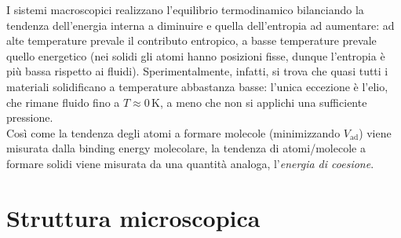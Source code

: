 
I sistemi macroscopici realizzano l'equilibrio termodinamico bilanciando la tendenza dell'energia interna a diminuire e quella dell'entropia ad aumentare: ad alte temperature prevale il contributo entropico, a basse temperature prevale quello energetico (nei solidi gli atomi hanno posizioni fisse, dunque l'entropia è più bassa rispetto ai fluidi). Sperimentalmente, infatti, si trova che quasi tutti i materiali solidificano a temperature abbastanza basse: l'unica eccezione è l'elio, che rimane fluido fino a $ T \approx 0 \,\text{K} $, a meno che non si applichi una sufficiente pressione. \\
Così come la tendenza degli atomi a formare molecole (minimizzando $ V_\text{ad} $) viene misurata dalla binding energy molecolare, la tendenza di atomi/molecole a formare solidi viene misurata da una quantità analoga, l'\textit{energia di coesione}.

\section{Struttura microscopica}

